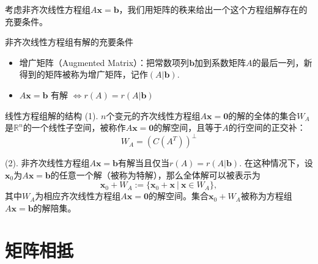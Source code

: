 
\begin{frame}

考虑非齐次线性方程组$A\mathbf{x} = \mathbf{b}$，我们用矩阵的秩来给出一个这个方程组解存在的充要条件。

\pause

\begin{block}{非齐次线性方程组有解的充要条件}
\begin{itemize}
\item 增广矩阵（Augmented Matrix）：把常数项列$\mathbf{b}$加到系数矩阵$A$的最后一列，新得到的矩阵被称为增广矩阵，记作$(A | \mathbf{b})$.
\item $A\mathbf{x} = \mathbf{b} \text{ 有解 } \Longleftrightarrow r(A) = r(A | \mathbf{b})$
\end{itemize}
\end{block}

\end{frame}


\begin{frame}

\begin{block}{线性方程组解的结构}
(1). $n$个变元的齐次线性方程组$A\mathbf{x} = \mathbf{0}$的解的全体的集合$W_A$是$\mathbb{R}^n$的一个线性子空间，被称作$A\mathbf{x} = \mathbf{0}$的解空间，且等于$A$的行空间的正交补：
$$W_A = (C(A^T))^{\perp}$$

\vspace{1em}
\pause

(2). 非齐次线性方程组$A\mathbf{x} = \mathbf{b}$有解当且仅当$r(A) = r(A | \mathbf{b})$. 在这种情况下，设$\mathbf{x}_0$为$A\mathbf{x} = \mathbf{b}$的任意一个解（被称为特解），那么全体解可以被表示为
$$\mathbf{x}_0 + W_A := \{ \mathbf{x}_0 + \mathbf{x} \ |\ \mathbf{x} \in W_A \},$$
其中$W_A$为相应齐次线性方程组$A\mathbf{x} = \mathbf{0}$的解空间。集合$\mathbf{x}_0 + W_A$被称为方程组$A\mathbf{x} = \mathbf{b}$的解陪集。
\end{block}

\end{frame}


\section{矩阵相抵}


